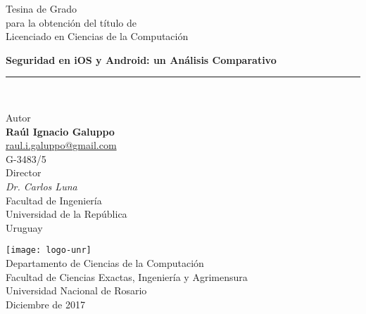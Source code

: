 \begin{titlepage}
    \begin{center}
        \LARGE
        Tesina de Grado\\
        \Large
        para la obtenci\'on del t\'itulo de\\
        Licenciado en Ciencias de la Computaci\'on
        \vfill
        
        \Huge
        \textbf{Seguridad en iOS y Android: un Análisis Comparativo}
        \rule{\textwidth}{1pt}\\
        \vspace{0.5cm}

        \large
        Autor\\
        \Large
        \textbf{Raúl Ignacio Galuppo}\\
        \normalsize
        \href{mailto:raul.i.galuppo@gmail.com}{raul.i.galuppo@gmail.com}\\
        G-3483/5\\
        \vspace{0.5cm}
        \large
        Director\\
        \Large
        \emph{Dr. Carlos Luna}\\
        
        \large
        Facultad de Ingeniería\\
        Universidad de la República\\
        Uruguay\\
        \vfill
        
        \texttt{[image: logo-unr]}\\
        \Large
        Departamento de Ciencias de la Computación\\
        Facultad de Ciencias Exactas, Ingeniería y Agrimensura\\
        Universidad Nacional de Rosario\\
        Diciembre de 2017
    \end{center}
\end{titlepage}